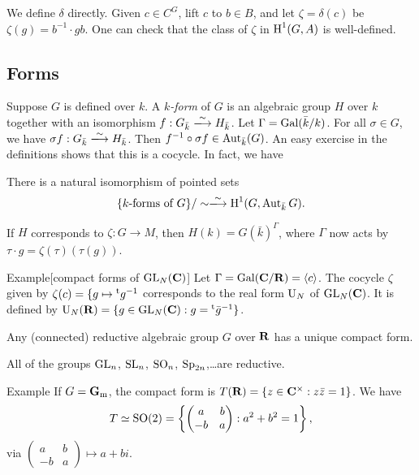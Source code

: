 We define $\delta$ directly. Given $c\in C^G$, lift $c$ to $b\in B$, and let 
$\zeta=\delta(c)$ be $\zeta(g)=b^{-1} \cdot g b$. One can check that the class 
of $\zeta$ in $\operatorname{H}^1(G,A)$ is well-defined. 





\subsection{Forms}

Suppose $G$ is defined over $k$. A \emph{$k$-form} of $G$ is an algebraic group 
$H$ over $k$ together with an isomorphism $f:G_{\bar k} \iso H_{\bar k}$. Let 
$\Gamma=\operatorname{Gal}(\bar k/k)$. For all $\sigma\in G$, we have 
$\sigma f:G_{\bar k}\iso H_{\bar k}$. Then 
$f^{-1}\circ \sigma f\in \operatorname{Aut}_{\bar k}(G)$. An easy exercise in the 
definitions shows that this is a cocycle. In fact, we have 

\begin{theo}
There is a natural isomorphism of pointed sets 
\[
  \{\text{$k$-forms of $G$}\}/\sim \iso \h^1(G,\automorphism_{\bar k} G) .
\]
\end{theo}

If $H$ corresponds to $\zeta:G\to M$, then $H(k)=G(\bar k)^\Gamma$, where 
$\Gamma$ now acts by $\tau \cdot g = \zeta(\tau)(\tau(g))$. 

\begin{enonce}[remark]{Example}[compact forms of $\operatorname{GL}_N(\mathbf{C})$]
Let $\Gamma=\operatorname{Gal}(\mathbf{C}/\mathbf{R})=\langle c\rangle$. The cocycle $\zeta$ given 
by $\zeta(c)=\{g\mapsto \prescript{\mathrm{t}}{}{g}^{-1}$ corresponds to the real form 
$\operatorname{U}_N$ of $\operatorname{GL}_N(\mathbf{C})$. It is defined by 
$\operatorname{U}_N(\mathbf{R}) = \{g\in \operatorname{GL}_N(\mathbf{C}):g=\prescript{\mathrm{t}}{}{\bar g}^{-1}\}$. 
\end{enonce}

\begin{theo}
Any (connected) reductive algebraic group $G$ over $\mathbf{R}$ has a unique compact 
form. 
\end{theo}

All of the groups $\operatorname{GL}_n$, $\operatorname{SL}_n$, $\operatorname{SO}_n$, 
$\operatorname{Sp}_{2 n}$,\ldots are reductive. 

\begin{enonce}[remark]{Example}
If $G=\mathbf{G}_{\mathrm{m}}$, the compact form is 
$T(\mathbf{R})=\{z\in \mathbf{C}^\times:z \bar z=1\}$. We have 
\[
  T\simeq \operatorname{SO}(2) = \left\{\begin{pmatrix} a & b \\ -b & a \end{pmatrix} : a^2+b^2=1\right\} ,
\]
via $\begin{pmatrix} a & b\\ -b & a \end{pmatrix} \mapsto a+b i$. 
\end{enonce}


